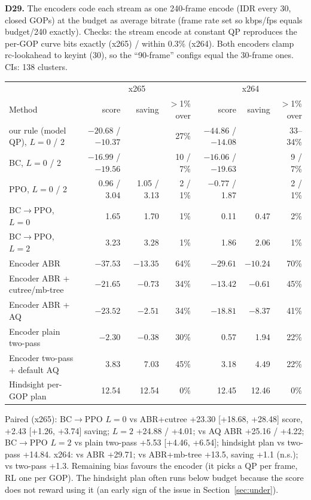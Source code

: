 \documentclass[10pt,a4paper]{article}
\begin{document}
\textbf{D29.} The encoders code each stream as one 240-frame encode (IDR every 30, closed GOPs) at the budget as
average bitrate (frame rate set so kbps/fps equals budget/240 exactly). Checks: the stream encode at constant QP
reproduces the per-GOP curve bits exactly (x265) / within 0.3\% (x264). Both encoders clamp rc-lookahead to keyint
(30), so the ``90-frame'' configs equal the 30-frame ones. CIs: 138 clusters.
\begin{center}\small
\begin{tabular}{lrrr|rrr}
\toprule
& \multicolumn{3}{c|}{x265} & \multicolumn{3}{c}{x264} \\
Method & score & saving & $>$1\% over & score & saving & $>$1\% over \\\midrule
our rule (model QP), $L=0$ / 2 & $-20.68$ / $-10.37$ & & 27\% & $-44.86$ / $-14.08$ & & 33--34\% \\
BC, $L=0$ / 2 & $-16.99$ / $-19.56$ & & 10 / 7\% & $-16.06$ / $-19.63$ & & 9 / 7\% \\
PPO, $L=0$ / 2 & 0.96 / 3.04 & 1.05 / 3.13 & 2 / 1\% & $-0.77$ / 1.87 & & 2 / 1\% \\
BC$\to$PPO, $L=0$ & 1.65 & 1.70 & 1\% & 0.11 & 0.47 & 2\% \\
BC$\to$PPO, $L=2$ & 3.23 & 3.28 & 1\% & 1.86 & 2.06 & 1\% \\
Encoder ABR & $-37.53$ & $-13.35$ & 64\% & $-29.61$ & $-10.24$ & 70\% \\
Encoder ABR + cutree/mb-tree & $-21.65$ & $-0.73$ & 34\% & $-13.42$ & $-0.61$ & 45\% \\
Encoder ABR + AQ & $-23.52$ & $-2.51$ & 34\% & $-18.81$ & $-8.37$ & 41\% \\
Encoder plain two-pass & $-2.30$ & $-0.38$ & 30\% & 0.57 & 1.94 & 22\% \\
Encoder two-pass + default AQ & 3.83 & 7.03 & 45\% & 3.18 & 4.49 & 22\% \\
Hindsight per-GOP plan & 12.54 & 12.54 & 0\% & 12.45 & 12.46 & 0\% \\
\bottomrule
\end{tabular}
\end{center}
Paired (x265): BC$\to$PPO $L=0$ vs ABR+cutree +23.30 [+18.68, +28.48] score, +2.43 [+1.26, +3.74] saving; $L=2$
+24.88 / +4.01; vs AQ ABR +25.16 / +4.22; BC$\to$PPO $L=2$ vs plain two-pass +5.53 [+4.46, +6.54]; hindsight plan vs
two-pass +14.84. x264: vs ABR +29.71; vs ABR+mb-tree +13.5, saving +1.1 (n.s.); vs two-pass +1.3. Remaining bias
favours the encoder (it picks a QP per frame, RL one per GOP). The hindsight plan often runs below budget because the
score does not reward using it (an early sign of the issue in Section~\ref{sec:under}).
\end{document}
